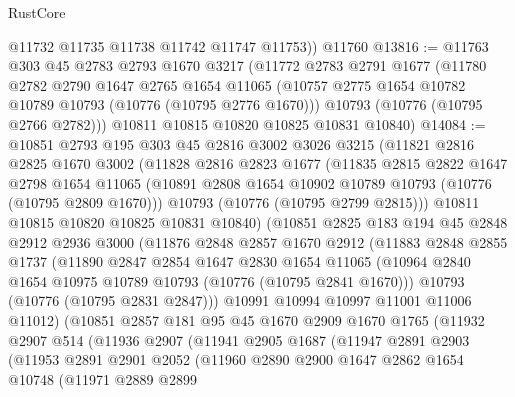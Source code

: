 \begin{lexlean}{RustCore}
\begin{coremodule}
        @11732
        @11735
        @11738
        @11742
        @11747
        @11753))
    @11760
@13816 := @11763
    @303
    @45
    @2783
    @2793
    @1670
    @3217
    (@11772
      @2783
      @2791
      @1677
      (@11780
        @2782
        @2790
        @1647
        @2765
        @1654
        @11065
        (@10757 @2775 @1654 @10782 @10789 @10793 (@10776 (@10795 @2776 @1670)))
        @10793
        (@10776 (@10795 @2766 @2782)))
      @10811
      @10815
      @10820
      @10825
      @10831
      @10840)
@14084 := @10851
    @2793
    @195
    @303
    @45
    @2816
    @3002
    @3026
    @3215
    (@11821
      @2816
      @2825
      @1670
      @3002
      (@11828
        @2816
        @2823
        @1677
        (@11835
          @2815
          @2822
          @1647
          @2798
          @1654
          @11065
          (@10891 @2808 @1654 @10902 @10789 @10793 (@10776 (@10795 @2809 @1670)))
          @10793
          (@10776 (@10795 @2799 @2815)))
        @10811
        @10815
        @10820
        @10825
        @10831
        @10840)
      (@10851
        @2825
        @183
        @194
        @45
        @2848
        @2912
        @2936
        @3000
        (@11876
          @2848
          @2857
          @1670
          @2912
          (@11883
            @2848
            @2855
            @1737
            (@11890
              @2847
              @2854
              @1647
              @2830
              @1654
              @11065
              (@10964 @2840 @1654 @10975 @10789 @10793 (@10776 (@10795 @2841 @1670)))
              @10793
              (@10776 (@10795 @2831 @2847)))
            @10991
            @10994
            @10997
            @11001
            @11006
            @11012)
          (@10851
            @2857
            @181
            @95
            @45
            @1670
            @2909
            @1670
            @1765
            (@11932
              @2907
              @514
              (@11936
                @2907
                (@11941
                  @2905
                  @1687
                  (@11947
                    @2891
                    @2903
                    (@11953
                      @2891
                      @2901
                      @2052
                      (@11960
                        @2890
                        @2900
                        @1647
                        @2862
                        @1654
                        @10748
                        (@11971
                          @2889
                          @2899

\end{coremodule}
\end{lexlean}
